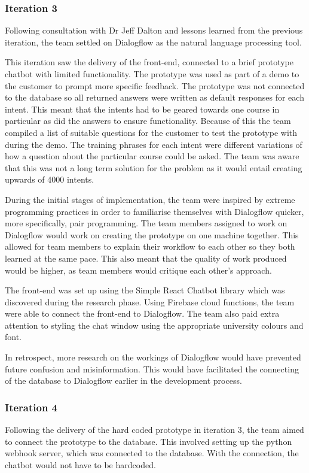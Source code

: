 \documentclass{l3proj}
\begin{document}
\subsubsection{Iteration 3}
\label{subsubsec:iter3}
Following consultation with Dr Jeff Dalton and lessons learned from the previous iteration, the team settled on Dialogflow as the natural language processing tool.

This iteration saw the delivery of the front-end, connected to a brief prototype chatbot with limited functionality. The prototype was used as part of a demo to the customer to prompt more specific feedback. The prototype was not connected to the database so all returned answers were written as default responses for each intent. This meant that the intents had to be geared towards one course in particular as did the answers to ensure functionality. Because of this the team compiled a list of suitable questions for the customer to test the prototype with during the demo. The training phrases for each intent were different variations of how a question about the particular course could be asked. The team was aware that this was not a long term solution for the problem as it would entail creating upwards of 4000 intents.

During the initial stages of implementation, the team were inspired by extreme programming practices in order to familiarise themselves with Dialogflow quicker, more specifically, pair programming. The team members assigned to work on Dialogflow would work on creating the prototype on one machine together. This allowed for team members to explain their workflow to each other so they both learned at the same pace. This also meant that the quality of work produced would be higher, as team members would critique each other's approach.

The front-end was set up using the Simple React Chatbot library which was discovered during the research phase. Using Firebase cloud functions, the team were able to connect the front-end to Dialogflow. The team also paid extra attention to styling the chat window using the appropriate university colours and font.

In retrospect, more research on the workings of Dialogflow would have prevented future confusion and misinformation. This would have facilitated the connecting of the database to Dialogflow earlier in the development process.


\subsubsection{Iteration 4}
\label{subsubsec:iter4}
Following the delivery of the hard coded prototype in iteration 3, the team aimed to connect the prototype to the database. This involved setting up the python webhook server, which was connected to the database. With the connection, the chatbot would not have to be hardcoded.
\end{document}
